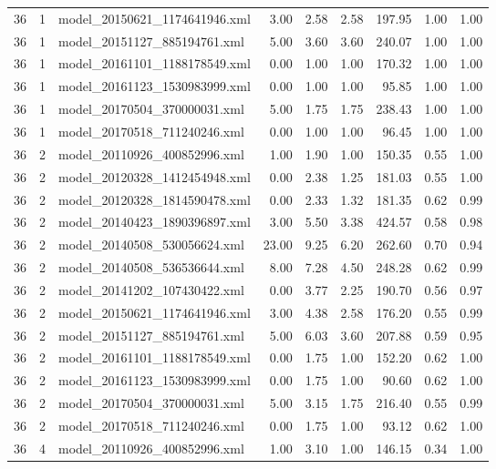 \begin{table}[ht]
\begin{tabular}{rrlrrrrrr}
   36 &   1 & model\_20150621\_1174641946.xml & 3.00 & 2.58 & 2.58 & 197.95 & 1.00 & 1.00 \\ 
   36 &   1 & model\_20151127\_885194761.xml & 5.00 & 3.60 & 3.60 & 240.07 & 1.00 & 1.00 \\ 
   36 &   1 & model\_20161101\_1188178549.xml & 0.00 & 1.00 & 1.00 & 170.32 & 1.00 & 1.00 \\ 
   36 &   1 & model\_20161123\_1530983999.xml & 0.00 & 1.00 & 1.00 & 95.85 & 1.00 & 1.00 \\ 
   36 &   1 & model\_20170504\_370000031.xml & 5.00 & 1.75 & 1.75 & 238.43 & 1.00 & 1.00 \\ 
   36 &   1 & model\_20170518\_711240246.xml & 0.00 & 1.00 & 1.00 & 96.45 & 1.00 & 1.00 \\ 
   36 &   2 & model\_20110926\_400852996.xml & 1.00 & 1.90 & 1.00 & 150.35 & 0.55 & 1.00 \\ 
   36 &   2 & model\_20120328\_1412454948.xml & 0.00 & 2.38 & 1.25 & 181.03 & 0.55 & 1.00 \\ 
   36 &   2 & model\_20120328\_1814590478.xml & 0.00 & 2.33 & 1.32 & 181.35 & 0.62 & 0.99 \\ 
   36 &   2 & model\_20140423\_1890396897.xml & 3.00 & 5.50 & 3.38 & 424.57 & 0.58 & 0.98 \\ 
   36 &   2 & model\_20140508\_530056624.xml & 23.00 & 9.25 & 6.20 & 262.60 & 0.70 & 0.94 \\ 
   36 &   2 & model\_20140508\_536536644.xml & 8.00 & 7.28 & 4.50 & 248.28 & 0.62 & 0.99 \\ 
   36 &   2 & model\_20141202\_107430422.xml & 0.00 & 3.77 & 2.25 & 190.70 & 0.56 & 0.97 \\ 
   36 &   2 & model\_20150621\_1174641946.xml & 3.00 & 4.38 & 2.58 & 176.20 & 0.55 & 0.99 \\ 
   36 &   2 & model\_20151127\_885194761.xml & 5.00 & 6.03 & 3.60 & 207.88 & 0.59 & 0.95 \\ 
   36 &   2 & model\_20161101\_1188178549.xml & 0.00 & 1.75 & 1.00 & 152.20 & 0.62 & 1.00 \\ 
   36 &   2 & model\_20161123\_1530983999.xml & 0.00 & 1.75 & 1.00 & 90.60 & 0.62 & 1.00 \\ 
   36 &   2 & model\_20170504\_370000031.xml & 5.00 & 3.15 & 1.75 & 216.40 & 0.55 & 0.99 \\ 
   36 &   2 & model\_20170518\_711240246.xml & 0.00 & 1.75 & 1.00 & 93.12 & 0.62 & 1.00 \\ 
   36 &   4 & model\_20110926\_400852996.xml & 1.00 & 3.10 & 1.00 & 146.15 & 0.34 & 1.00 \\ 

\end{tabular}
\end{table}
